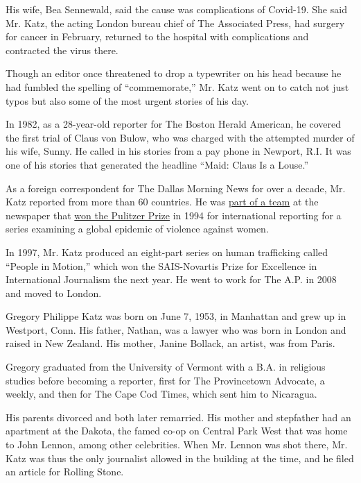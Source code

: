 His wife, Bea Sennewald, said the cause was complications of Covid-19.
She said Mr. Katz, the acting London bureau chief of The Associated
Press, had surgery for cancer in February, returned to the hospital with
complications and contracted the virus there.

Though an editor once threatened to drop a typewriter on his head
because he had fumbled the spelling of ``commemorate,'' Mr. Katz went on
to catch not just typos but also some of the most urgent stories of his
day.

In 1982, as a 28-year-old reporter for The Boston Herald American, he
covered the first trial of Claus von Bulow, who was charged with the
attempted murder of his wife, Sunny. He called in his stories from a pay
phone in Newport, R.I. It was one of his stories that generated the
headline ``Maid: Claus Is a Louse.''

As a foreign correspondent for The Dallas Morning News for over a
decade, Mr. Katz reported from more than 60 countries. He was
\href{https://www.dallasnews.com/news/2017/08/16/flashback-a-look-back-at-the-dallas-morning-news-pulitzer-winning-journalism/}{part
of a team} at the newspaper that
\href{https://www.pulitzer.org/winners/dallas-morning-news-team}{won the
Pulitzer Prize} in 1994 for international reporting for a series
examining a global epidemic of violence against women.

In 1997, Mr. Katz produced an eight-part series on human trafficking
called ``People in Motion,'' which won the SAIS-Novartis Prize for
Excellence in International Journalism the next year. He went to work
for The A.P. in 2008 and moved to London.

Gregory Philippe Katz was born on June 7, 1953, in Manhattan and grew up
in Westport, Conn. His father, Nathan, was a lawyer who was born in
London and raised in New Zealand. His mother, Janine Bollack, an artist,
was from Paris.

Gregory graduated from the University of Vermont with a B.A. in
religious studies before becoming a reporter, first for The Provincetown
Advocate, a weekly, and then for The Cape Cod Times, which sent him to
Nicaragua.

His parents divorced and both later remarried. His mother and stepfather
had an apartment at the Dakota, the famed co-op on Central Park West
that was home to John Lennon, among other celebrities. When Mr. Lennon
was shot there, Mr. Katz was thus the only journalist allowed in the
building at the time, and he filed an article for Rolling Stone.

